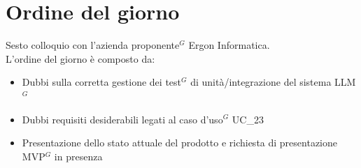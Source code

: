 \section*{Ordine del giorno}
Sesto colloquio con l'azienda proponente$^G$ Ergon Informatica.\\
L'ordine del giorno è composto da:
\begin{itemize}
	\item Dubbi sulla corretta gestione dei test$^G$ di unità/integrazione del sistema LLM$^G$ 
	\item Dubbi requisiti desiderabili legati al caso d'uso$^G$ UC\_23
	\item Presentazione dello stato attuale del prodotto e richiesta di presentazione MVP$^G$ in presenza
\end{itemize}